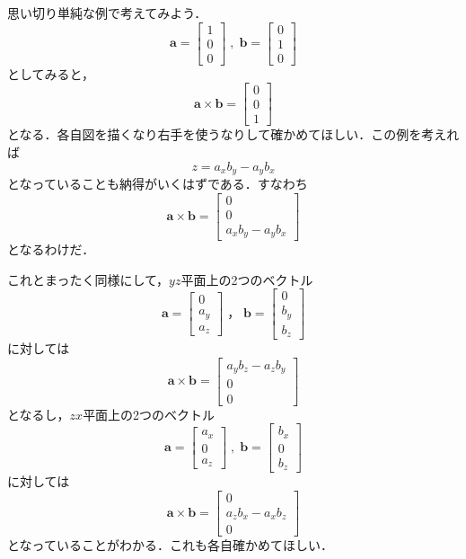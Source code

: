 思い切り単純な例で考えてみよう．
$$
\bm{a} = \left[
 \begin{array}{c}
  1 \\ 
  0 \\
  0
 \end{array}
\right]
\; , \; 
\bm{b} = \left[
 \begin{array}{c}
  0 \\ 
  1 \\
  0
 \end{array}
\right]
$$
としてみると，
$$
\bm{a} \times \bm{b} = \left[
 \begin{array}{c}
  0 \\
  0 \\
  1
 \end{array}
\right]
$$
となる．各自図を描くなり右手を使うなりして確かめてほしい．この例を考えれば
$$
z = a_x b_y - a_y b_x
$$
となっていることも納得がいくはずである．すなわち
$$
\bm{a} \times \bm{b} = \left[
 \begin{array}{c}
  0 \\
  0 \\
  a_x b_y - a_y b_x
 \end{array}
\right]
$$
となるわけだ．

これとまったく同様にして，$yz$平面上の2つのベクトル
$$
\bm{a} = \left[
 \begin{array}{c}
  0 \\ 
  a_y \\
  a_z
 \end{array}
\right]
\; ，\; 
\bm{b} = \left[
 \begin{array}{c}
  0 \\ 
  b_y \\
  b_z
 \end{array}
\right]
$$
に対しては
$$
\bm{a} \times \bm{b} = \left[
 \begin{array}{c}
  a_y b_z - a_z b_y \\
  0 \\
  0
 \end{array}
\right]
$$
となるし，$zx$平面上の2つのベクトル
$$
\bm{a} = \left[
 \begin{array}{c}
  a_x \\ 
  0 \\
  a_z
 \end{array}
\right]
\; , \; 
\bm{b} = \left[
 \begin{array}{c}
  b_x \\ 
  0 \\
  b_z
 \end{array}
\right]
$$
に対しては
$$
\bm{a} \times \bm{b} = \left[
 \begin{array}{c}
  0 \\
  a_z b_x - a_x b_z \\
  0
 \end{array}
\right]
$$
となっていることがわかる．これも各自確かめてほしい．

